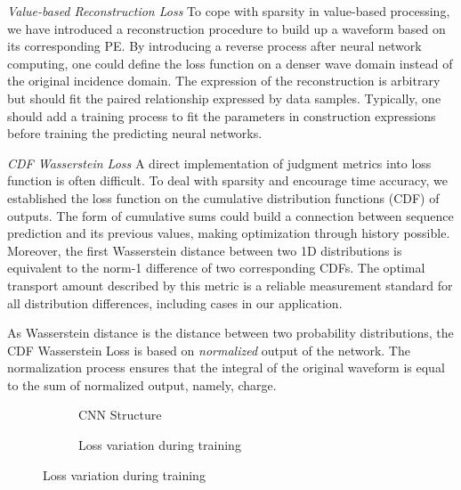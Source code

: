 \emph{Value-based Reconstruction Loss}
To cope with sparsity in value-based processing, we have introduced a reconstruction procedure to build up a waveform based on its corresponding PE. By introducing a reverse process after neural network computing, one could define the loss function on a denser wave domain instead of the original incidence domain. The expression of the reconstruction is arbitrary but should fit the paired relationship expressed by data samples. Typically, one should add a training process to fit the parameters in construction expressions before training the predicting neural networks.

\emph{CDF Wasserstein Loss}
A direct implementation of judgment metrics into loss function is often difficult. To deal with sparsity and encourage time accuracy, we established the loss function on the cumulative distribution functions (CDF) of outputs. The form of cumulative sums could build a connection between sequence prediction and its previous values, making optimization through history possible. Moreover, the first Wasserstein distance between two 1D distributions is equivalent to the norm-1 difference of two corresponding CDFs. The optimal transport amount described by this metric is a reliable measurement standard for all distribution differences, including cases in our application. 

As Wasserstein distance is the distance between two probability distributions, the CDF Wasserstein Loss is based on \emph{normalized} output of the network. The normalization process ensures that the integral of the original waveform is equal to the sum of normalized output, namely, charge. 

\begin{figure}[H]
\begin{minipage}[b]{.4\textwidth}
\begin{figure}[H]
    \begin{center}
    \begin{adjustbox}{width=0.6\textwidth}
        
    \end{adjustbox}
    \end{center}
    \caption{\label{fig:struct} CNN Structure}
\end{figure}
\end{minipage}
\begin{minipage}[b]{.6\textwidth}
\begin{figure}[H]
    \centering
    \resizebox{\textwidth}{!}{}
    \caption{\label{fig:loss} Loss variation during training}
\end{figure}
\end{minipage}
\end{figure}

